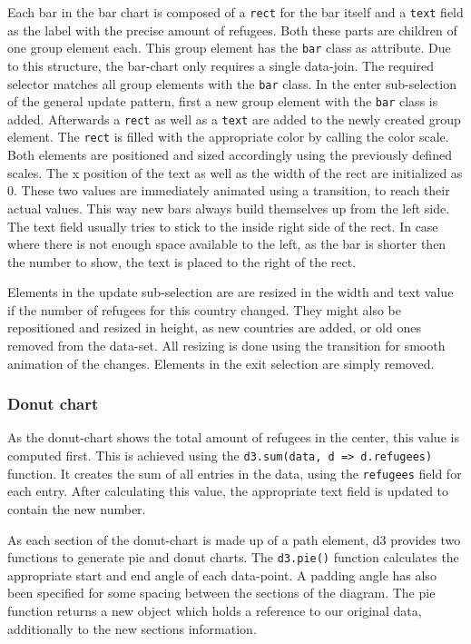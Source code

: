 Each bar in the bar chart is composed of a \texttt{rect} for the bar itself and a \texttt{text} field as the label with the precise amount of refugees. Both these parts are children of one group element each. This group element has the \texttt{bar} class as attribute. Due to this structure, the bar-chart only requires a single data-join. The required selector matches all group elements with the \texttt{bar} class. In the enter sub-selection of the general update pattern, first a new group element with the \texttt{bar} class is added. Afterwards a \texttt{rect} as well as a \texttt{text} are added to the newly created group element.  The \texttt{rect} is filled with the appropriate color by calling the color scale. Both elements are positioned and sized accordingly using the previously defined scales. The x position of the text as well as the width of the rect are initialized as 0. These two values are immediately animated using a transition, to reach their actual values. This way new bars always build themselves up from the left side. The text field usually tries to stick to the inside right side of the rect. In case where there is not enough space available to the left, as the bar is shorter then the number to show, the text is placed to the right of the rect.

Elements in the update sub-selection are are resized in the width and text value if the number of refugees for this country changed. They might also be repositioned and resized in height, as new countries are added, or old ones removed from the data-set. All resizing is done using the transition for smooth animation of the changes. Elements in the exit selection are simply removed.

\subsubsection{Donut chart}
As the donut-chart shows the total amount of refugees in the center, this value is computed first. This is achieved using the \texttt{d3.sum(data, d => d.refugees)} function. It creates the sum of all entries in the data, using the \texttt{refugees} field for each entry. After calculating this value, the appropriate text field is updated to contain the new number.

As each section of the donut-chart is made up of a path element, d3 provides two functions to generate pie and donut charts. The \texttt{d3.pie()} function calculates the appropriate start and end angle of each data-point. A padding angle has also been specified for some spacing between the sections of the diagram. The pie function returns a new object which holds a reference to our original data, additionally to the new sections information. 

